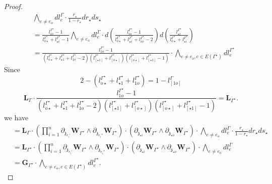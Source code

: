 \documentclass[11pt]{amsart}
\theoremstyle{definition}
\theoremstyle{remark}
\numberwithin{equation}{section}
\begin{document}
\begin{proof}
\begin{align*}
   & \bigwedge_{e\neq e_{o}}dl^{\Gamma}_{e}\cdot \frac{r_{\star}}{1-r_{\star}}dr_{\star}ds_{\star} \\
   & =\frac{l_{io}^{\Gamma^{\star}}-1}{l^{\Gamma^{\star}}_{o\star }+l^{\Gamma^{\star}}_{\star i}-1}\bigwedge_{e\neq e_{o}}dl^{\Gamma}_{e}\cdot d\left(\frac{l_{io}^{\Gamma^{\star}}-1}{l^{\Gamma^{\star}}_{o\star }+l^{\Gamma^{\star}}_{\star i}+l_{io}^{\Gamma^{\star}}-2}\right)d\left(\frac{l^{\Gamma^{\star}}_{\star i}}{l^{\Gamma^{\star}}_{o\star }+l^{\Gamma^{\star}}_{\star i}}\right)\\
   &=\frac{l_{1o}^{\Gamma^{\star}}-1}{(l^{\Gamma^{\star}}_{o\star }+l^{\Gamma^{\star}}_{\star 1}+l_{1o}^{\Gamma^{\star}}-2)(l^{\Gamma^\star}_{[ \star 1]}+l^{\Gamma^\star}_{[ o\star ]})(l^{\Gamma^\star}_{[ o\star]}+l^{\Gamma^\star}_{[ \star 1]}-1)}\cdot \bigwedge_{e\neq e_{o},e\in E(\Gamma^{\star})}dl^{\Gamma^{\star}}_{e}
\end{align*}
Since
$$
2-(l^{\Gamma^{\star}}_{o\star }+l^{\Gamma^{\star}}_{\star 1}+l_{1o}^{\Gamma^{\star}})=1-l^{\Gamma}_{[1o]}
$$
$$
\mathbf{L}_{\Gamma}\cdot \frac{l_{1o}^{\Gamma^{\star}}-1}{(l^{\Gamma^{\star}}_{o\star }+l^{\Gamma^{\star}}_{\star 1}+l_{1o}^{\Gamma^{\star}}-2)(l^{\Gamma^\star}_{[ \star 1]}+l^{\Gamma^\star}_{[ o\star ]})(l^{\Gamma^\star}_{[ o\star]}+l^{\Gamma^\star}_{[ \star 1]}-1)}=\mathbf{L}_{\Gamma^{\star}}.
$$
we have
\begin{align*}
   &=\mathbf{L}_{\Gamma}\cdot\left(\prod^n_{i=1}\partial_{\mathfrak{z}_{e_i'}}\mathbf{W}_{\Gamma^{\star}}\wedge\partial_{\mathfrak{z}_{e_i''}}\mathbf{W}_{\Gamma^{\star}}\right)\cdot  \left( \partial_{\mathfrak{z}_{\star i}}\mathbf{W}_{\Gamma^{\star}}\wedge \partial_{\mathfrak{z}_{\star o}}\mathbf{W}_{\Gamma^{\star}}\right)\cdot \bigwedge_{e\neq e_{o}}dl^{\Gamma}_{e}\cdot  \frac{r_{\star}}{1- r_{\star}} dr_{\star}ds_{\star} \\
   & =\mathbf{L}_{\Gamma^{\star}}\cdot\left(\prod^n_{i=1}\partial_{\mathfrak{z}_{e_i'}}\mathbf{W}_{\Gamma^{\star}}\wedge\partial_{\mathfrak{z}_{e_i''}}\mathbf{W}_{\Gamma^{\star}}\right)\cdot  \left( \partial_{\mathfrak{z}_{\star i}}\mathbf{W}_{\Gamma^{\star}}\wedge \partial_{\mathfrak{z}_{\star o}}\mathbf{W}_{\Gamma^{\star}}\right)\cdot \bigwedge_{e\neq e_{o}}dl^{\Gamma}_{e}\\
   &=\mathbf{G}_{\Gamma^{\star}}\cdot \bigwedge_{e\neq e_{o},e\in E(\Gamma^{\star})}dl^{\Gamma^{\star}}_{e}.
\end{align*}
\end{proof}
\iffalse
\end{document}
